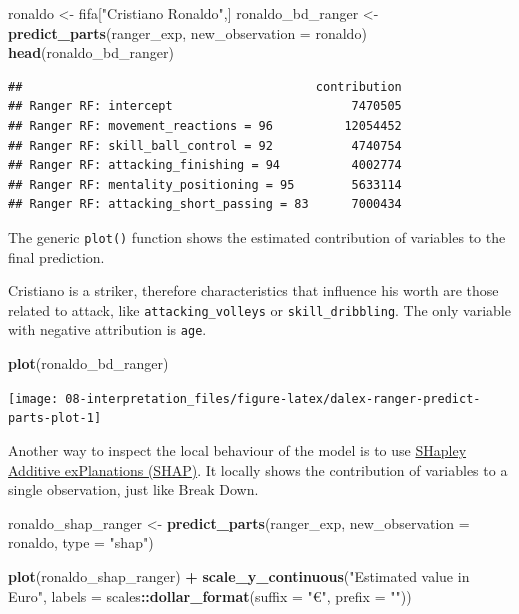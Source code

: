 \documentclass[]{scrbook}
\newenvironment{Shaded}{\begin{snugshade}}{\end{snugshade}}
\newcommand{\DataTypeTok}[1]{\textcolor[rgb]{0.13,0.29,0.53}{#1}}
\newcommand{\KeywordTok}[1]{\textcolor[rgb]{0.13,0.29,0.53}{\textbf{#1}}}
\newcommand{\NormalTok}[1]{#1}
\newcommand{\OperatorTok}[1]{\textcolor[rgb]{0.81,0.36,0.00}{\textbf{#1}}}
\newcommand{\StringTok}[1]{\textcolor[rgb]{0.31,0.60,0.02}{#1}}
\renewenvironment{Shaded} {\begin{snugshade}\small} {\end{snugshade}}
\begin{document}
\begin{Shaded}
\begin{Highlighting}[]
\NormalTok{ronaldo <-}\StringTok{ }\NormalTok{fifa[}\StringTok{"Cristiano Ronaldo"}\NormalTok{,]}
\NormalTok{ronaldo_bd_ranger <-}\StringTok{ }\KeywordTok{predict_parts}\NormalTok{(ranger_exp,}
                        \DataTypeTok{new_observation =}\NormalTok{ ronaldo)}
\KeywordTok{head}\NormalTok{(ronaldo_bd_ranger)}
\end{Highlighting}
\end{Shaded}

\begin{verbatim}
##                                         contribution
## Ranger RF: intercept                         7470505
## Ranger RF: movement_reactions = 96          12054452
## Ranger RF: skill_ball_control = 92           4740754
## Ranger RF: attacking_finishing = 94          4002774
## Ranger RF: mentality_positioning = 95        5633114
## Ranger RF: attacking_short_passing = 83      7000434
\end{verbatim}

The generic \texttt{plot()} function shows the estimated contribution of variables to the final prediction.

Cristiano is a striker, therefore characteristics that influence his worth are those related to attack, like \texttt{attacking\_volleys} or \texttt{skill\_dribbling}. The only variable with negative attribution is \texttt{age}.

\begin{Shaded}
\begin{Highlighting}[]
\KeywordTok{plot}\NormalTok{(ronaldo_bd_ranger)}
\end{Highlighting}
\end{Shaded}

\begin{center}\texttt{[image: 08-interpretation\_files/figure-latex/dalex-ranger-predict-parts-plot-1]} \end{center}

Another way to inspect the local behaviour of the model is to use \href{https://pbiecek.github.io/ema/shapley.html}{SHapley Additive exPlanations (SHAP)}. It locally shows the contribution of variables to a single observation, just like Break Down.

\begin{Shaded}
\begin{Highlighting}[]
\NormalTok{ronaldo_shap_ranger <-}\StringTok{ }\KeywordTok{predict_parts}\NormalTok{(ranger_exp,}
                        \DataTypeTok{new_observation =}\NormalTok{ ronaldo,}
                        \DataTypeTok{type =} \StringTok{"shap"}\NormalTok{)}

\KeywordTok{plot}\NormalTok{(ronaldo_shap_ranger) }\OperatorTok{+}
\StringTok{  }\KeywordTok{scale_y_continuous}\NormalTok{(}\StringTok{"Estimated value in Euro"}\NormalTok{, }\DataTypeTok{labels =}\NormalTok{ scales}\OperatorTok{::}\KeywordTok{dollar_format}\NormalTok{(}\DataTypeTok{suffix =} \StringTok{"€"}\NormalTok{, }\DataTypeTok{prefix =} \StringTok{""}\NormalTok{))}
\end{Highlighting}
\end{Shaded}
\end{document}
